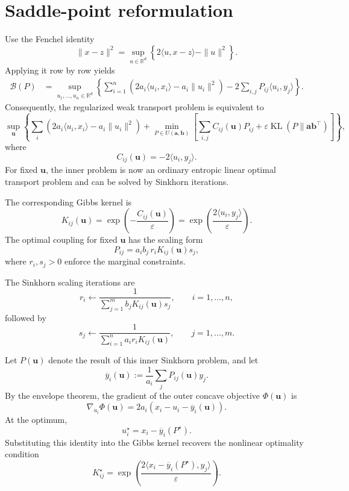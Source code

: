 \documentclass[11pt]{article}
\newcommand{\R}{\mathbb{R}}
\newcommand{\KL}{\operatorname{KL}}
\begin{document}
\section{Saddle-point reformulation}

Use the Fenchel identity
\[
    \|x-z\|^2
    =
    \sup_{u\in\R^d}
    \left\{
        2\langle u,x-z\rangle-\|u\|^2
    \right\}.
\]
Applying it row by row yields
\begin{align*}
    \mathcal{B}(P)
    &=
    \sup_{u_1,\ldots,u_n\in\R^d}
    \left\{
        \sum_{i=1}^n
        \left(
            2a_i\langle u_i,x_i\rangle
            -a_i\|u_i\|^2
        \right)
        -
        2\sum_{i,j}P_{ij}\langle u_i,y_j\rangle
    \right\}.
\end{align*}
Consequently, the regularized weak transport problem is equivalent to
\[
    \sup_{\bm{u}}
    \left\{
        \sum_i
        \left(
            2a_i\langle u_i,x_i\rangle-a_i\|u_i\|^2
        \right)
        +
        \min_{P\in U(\bm{a},\bm{b})}
        \left[
            \sum_{i,j}C_{ij}(\bm{u})P_{ij}
            +
            \varepsilon\KL(P\|\bm{a}\bm{b}^{\top})
        \right]
    \right\},
\]
where
\[
    C_{ij}(\bm{u})
    =
    -2\langle u_i,y_j\rangle.
\]
For fixed $\bm{u}$, the inner problem is now an ordinary entropic linear
optimal transport problem and can be solved by Sinkhorn iterations.

The corresponding Gibbs kernel is
\[
    K_{ij}(\bm{u})
    =
    \exp\left(
        -\frac{C_{ij}(\bm{u})}{\varepsilon}
    \right)
    =
    \exp\left(
        \frac{2\langle u_i,y_j\rangle}{\varepsilon}
    \right).
\]
The optimal coupling for fixed $\bm{u}$ has the scaling form
\[
    P_{ij}
    =
    a_i b_j\,r_i K_{ij}(\bm{u})s_j,
\]
where $r_i,s_j>0$ enforce the marginal constraints.

The Sinkhorn scaling iterations are
\[
    r_i
    \leftarrow
    \frac{1}{
        \sum_{j=1}^m b_j K_{ij}(\bm{u})s_j
    },
    \qquad i=1,\ldots,n,
\]
followed by
\[
    s_j
    \leftarrow
    \frac{1}{
        \sum_{i=1}^n a_i r_i K_{ij}(\bm{u})
    },
    \qquad j=1,\ldots,m.
\]

Let $P(\bm{u})$ denote the result of this inner Sinkhorn problem, and let
\[
    \overline{y}_i(\bm{u})
    :=
    \frac{1}{a_i}\sum_j P_{ij}(\bm{u})y_j.
\]
By the envelope theorem, the gradient of the outer concave objective
$\Phi(\bm{u})$ is
\[
    \nabla_{u_i}\Phi(\bm{u})
    =
    2a_i
    \left(
        x_i-u_i-\overline{y}_i(\bm{u})
    \right).
\]
At the optimum,
\[
    \boxed{
    u_i^\star
    =
    x_i-\overline{y}_i(P^\star).
    }
\]
Substituting this identity into the Gibbs kernel recovers the nonlinear
optimality condition
\[
    K_{ij}^\star
    =
    \exp\left(
        \frac{
            2\langle
                x_i-\overline{y}_i(P^\star),y_j
            \rangle
        }{\varepsilon}
    \right).
\]
\end{document}
